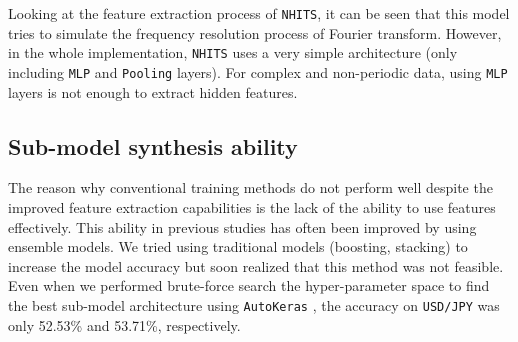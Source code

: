 \documentclass[aps,prb,groupedaddress,twocolumn,showpacs,dvipdfmx,superscriptaddress,pdftex]{revtex4-2}
\begin{document}

Looking at the feature extraction process of \verb|NHITS|, it can be seen that this model tries to simulate the frequency resolution process of Fourier transform. However, in the whole implementation, \verb|NHITS| uses a very simple architecture (only including \verb|MLP| and \verb|Pooling| layers). For complex and non-periodic data, using \verb|MLP| layers is not enough to extract hidden features.

\subsection{Sub-model synthesis ability}


The reason why conventional training methods do not perform well despite the improved feature extraction capabilities is the lack of the ability to use features effectively. This ability in previous studies has often been improved by using ensemble models. We tried using traditional models (boosting, stacking) to increase the model accuracy but soon realized that this method was not feasible. Even when we performed brute-force search the hyper-parameter space to find the best sub-model architecture using \verb|AutoKeras| \cite{jin2023autokeras}, the accuracy on \verb|USD/JPY| was only 52.53\% and 53.71\%, respectively.

\vspace{2mm}
\end{document}
